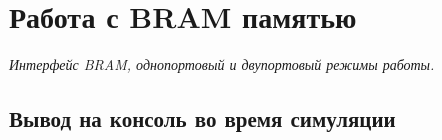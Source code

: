 \chapter{Работа с BRAM памятью}

\emph{Интерфейс BRAM, однопортовый и двупортовый режимы работы.}

\section{Вывод на консоль во время симуляции}

